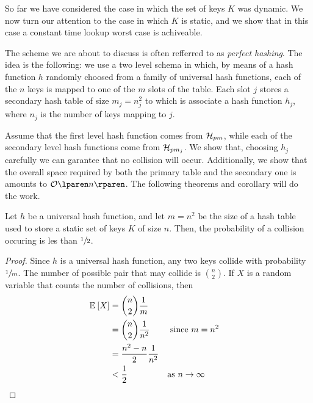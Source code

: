 \documentclass{subfiles}
\begin{document}
    So far we have considered the case in which the set of keys \(K\) was dynamic.
        We now turn our attention to the case in which \(K\) is static,
        and we show that in this case a constant time lookup worst case is achiveable.

    The scheme we are about to discuss is often refferred to as \emph{perfect hashing}.
        The idea is the following: we use a two level schema in which,
        by means of a hash function \(h\) randomly choosed from a family of universal hash functions,
        each of the \(n\) keys is mapped to one of the \(m\) slots of the table.
        Each slot \(j\) stores a secondary hash table of size \(m_{j} = n_{j}^{2}\) 
        to which is associate a hash function \(h_{j}\), 
        where \(n_{j}\) is the number of keys mapping to \(j\).
    
    Assume that the first level hash function comes from \(\mathcal{H}_{pm}\), 
        while each of the secondary level hash functions come from \(\mathcal{H}_{pm_{j}}\).
        We show that, choosing \(h_{j}\) carefully we can garantee that no collision will occur.
        Additionally, we show that the overall space required by both the primary table 
        and the secondary one is amounts to \(\ofO{n}\).
        The following theorems and corollary will do the work.

    \begin{theorem*}
        Let \(h\) be a universal hash function, and let \(m = n^{2}\) be the size of a hash table 
            used to store a static set of keys \(K\) of size \(n\). Then,
            the probability of a collision occuring is les than \(\sfrac{1}{2}\).
    \end{theorem*}
    \begin{proof}
        Since \(h\) is a universal hash function, any two keys collide with probability \(\sfrac{1}{m}\).
            The number of possible pair that may collide is \(\binom{n}{2}\).
            If \(X\) is a random variable that counts the number of collisions, 
            then 
            \[\begin{aligned}
                \E[X]{} & = \binom{n}{2} \frac{1}{m} \\
                        & = \binom{n}{2} \frac{1}{n^{2}} && \text{ since \(m = n^{2} \)}\\ 
                        & = \frac{n^{2} - n}{2} \frac{1}{n^{2}} \\ 
                        & < \frac{1}{2} && \text{as \(n \to \infty\)}
            \end{aligned}\]
    \end{proof}
\end{document}
